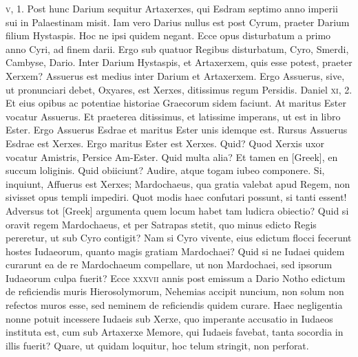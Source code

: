 \begin{parnumbers}
\textsc{v}, 1.
\lnr{}Post hunc Darium sequitur Artaxerxes, qui Esdram septimo anno
imperii sui in Palaestinam misit.
\lnr{}Iam vero Darius nullus est post Cyrum,
praeter Darium filium Hystaspis.
\lnr{}Hoc ne ipsi quidem negant.
\lnr{}Ecce opus disturbatum a primo anno Cyri, ad finem darii.
\lnr{}Ergo sub quatuor Regibus disturbatum, Cyro, Smerdi, Cambyse,
Dario.
\lnr{}Inter Darium Hystaspis, et Artaxerxem, quis esse potest,
praeter Xerxem?
\lnr{}Assuerus est medius inter Darium et Artaxerxem.
\lnr{}Ergo Assuerus, sive, ut pronunciari debet, Oxyares, est Xerxes, ditissimus
regum Persidis.
\lnr{}Daniel \textsc{xi}, 2.
\lnr{}Et eius opibus ac potentiae historiae
Graecorum sidem faciunt.
\lnr{}At maritus Ester vocatur Assuerus.
\lnr{}Et praeterea ditissimus, et latissime imperans, ut est in libro
Ester.
\lnr{}Ergo Assuerus Esdrae et maritus Ester unis idemque est.
\lnr{}Rursus Assuerus Esdrae est Xerxes.
\lnr{}Ergo maritus Ester est Xerxes.
\lnr{}Quid?
\lnr{}Quod Xerxis uxor vocatur Amistris, Persice Am-Ester.
\lnr{}Quid multa alia?
\lnr{}Et tamen en \textgreek{[Greek]}, en succum loliginis.
\lnr{}Quid obiiciunt?
\lnr{}Audire, atque togam iubeo componere.
\lnr{}Si, inquiunt, Affuerus est Xerxes;
Mardochaeus, qua gratia valebat apud Regem, non sivisset opus
templi impediri.
\lnr{}Quot modis haec confutari possunt, si tanti essent!
\lnr{}Adversus tot \textgreek{[Greek]} argumenta quem locum
 habet tam ludicra obiectio?
\lnr{}Quid si oravit regem Mardochaeus, et per Satrapas stetit, quo
minus edicto Regis pereretur, ut sub Cyro contigit?
\lnr{}Nam si Cyro vivente,
eius edictum flocci fecerunt hostes Iudaeorum, quanto magis
gratiam Mardochaei?
\lnr{}Quid si ne Iudaei quidem curarunt ea de re Mardochaeum
compellare, ut non Mardochaei, sed ipsorum Iudaeorum
culpa fuerit?
\lnr{}Ecce \textsc{xxxvii} annis post emissum a Dario Notho edictum
de reficiendis muris Hierosolymorum, Nehemias accipit nuncium,
non solum non refectos muros esse, sed neminem de reficiendis
quidem curare.
\lnr{}Haec negligentia nonne potuit incessere Iudaeis sub
Xerxe, quo imperante accusatio in Iudaeos instituta est, cum sub Artaxerxe
Memore, qui Iudaeis favebat, tanta socordia in illis fuerit?
\lnr{}Quare, ut quidam loquitur, hoc telum stringit, non perforat.


\end{parnumbers}
